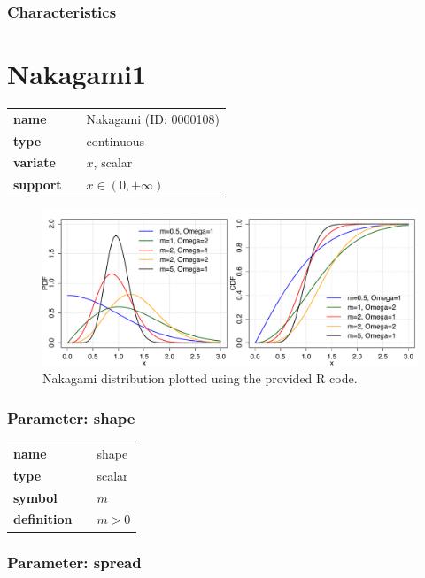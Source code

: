 \subsubsection*{Characteristics}
\smallskip
\section*{Nakagami1} 

  \bigskip 

\begin{tabular}{p{2cm}cl}
\textbf{name} & & Nakagami (ID: 0000108)\\ 
 
\textbf{type} & & continuous \\ 

\textbf{variate} & & $x$, scalar \\ 

\textbf{support} & & $x \in (0,+\infty)$
\end{tabular}

\begin{figure}[ht!]
\centering
  \includegraphics[width=140mm]{pics/Nakagami.pdf}
 \caption{Nakagami distribution plotted using the provided R code.}
 \label{fig:Nakagami}
\end{figure}

\subsubsection*{Parameter: shape}

\noindent\begin{tabular}{p{2cm}cl}
\textbf{name} & & shape \\
\textbf{type} & & scalar \\
\textbf{symbol} & & $m$  \\
\textbf{definition} & & $m > 0$
\end{tabular}
\subsubsection*{Parameter: spread}

